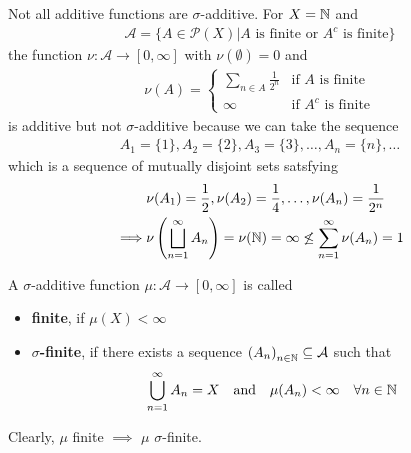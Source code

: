 \begin{ex}[]
Not all additive functions are $\sigma$-additive. 
For $X = \mathbb{N}$ and
\begin{align*}
  \mathcal{A} = \{A \in \mathcal{P}(X) \big\vert A \text{ is finite or } A^{c} \text{ is finite}\}
\end{align*}
the function $\nu: \mathcal{A} \to [0,\infty]$ with $\nu(\emptyset) = 0$ and
\begin{align*}
  \nu(A) = \left\{\begin{array}{ll}
      \underset{n \in A}{\sum} \frac{1}{2^{n}} & \text{if $A$ is finite}\\
      \infty & \text{if $A^{c}$ is finite}
  \end{array} \right.
\end{align*}
is additive but not $\sigma$-additive because we can take the sequence
\begin{align*}
  A_1 = \{1\}, A_2 = \{2\}, A_3 = \{3\}, \ldots, A_n = \{n\}, \ldots
\end{align*}
which is a sequence of mutually disjoint sets satsfying
\begin{align*}
  &\nu(A_1) = \frac{1}{2}, \nu(A_2) = \frac{1}{4}, \ldots, \nu(A_n) = \frac{1}{2^{n}} \\
  \implies 
  &\nu \left(
    \bigsqcup_{n=1}^{\infty}A_n
  \right)
  = \nu(\mathbb{N})
  = \infty \not\leq \sum_{n=1}^{\infty}\nu(A_n) = 1
\end{align*}
\end{ex}

\begin{dfn}[]
  A $\sigma$-additive function $\mu: \mathcal{A} \to [0,\infty]$ is called
    \begin{itemize}
      \item \textbf{finite}, if $\mu(X) < \infty$
      \item \textbf{$\sigma$-finite}, if there exists a sequence $\left(A_{n}\right)_{n \in \mathbb{N}} \subseteq \mathcal{A}$ such that
        \begin{align*}
          \bigcup_{n=1}^{\infty}A_n = X \quad \text{and} \quad \mu(A_n) < \infty \quad \forall n \in \mathbb{N}
        \end{align*}
    \end{itemize}
\end{dfn}
Clearly, $\mu$ finite $\implies$ $\mu$ $\sigma$-finite.

